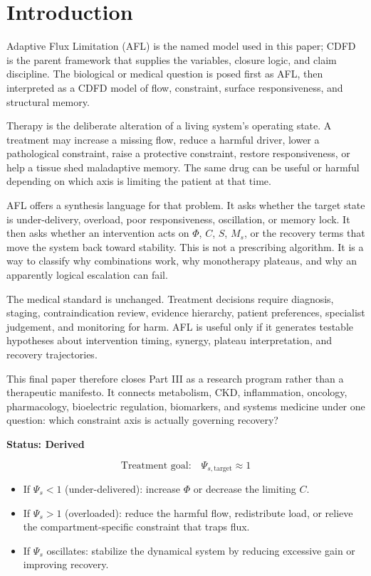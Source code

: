 \documentclass[12pt,a4paper]{article}
\begin{document}
\section{Introduction}

Adaptive Flux Limitation (AFL) is the named model used in this paper; CDFD is the parent framework that supplies the variables, closure logic, and claim discipline. The biological or medical question is posed first as AFL, then interpreted as a CDFD model of flow, constraint, surface responsiveness, and structural memory.

Therapy is the deliberate alteration of a living system's operating state. A treatment may increase a missing flow, reduce a harmful driver, lower a pathological constraint, raise a protective constraint, restore responsiveness, or help a tissue shed maladaptive memory. The same drug can be useful or harmful depending on which axis is limiting the patient at that time.

AFL offers a synthesis language for that problem. It asks whether the target state is under-delivery, overload, poor responsiveness, oscillation, or memory lock. It then asks whether an intervention acts on $\Phi$, $C$, $S$, $M_s$, or the recovery terms that move the system back toward stability. This is not a prescribing algorithm. It is a way to classify why combinations work, why monotherapy plateaus, and why an apparently logical escalation can fail.

The medical standard is unchanged. Treatment decisions require diagnosis, staging, contraindication review, evidence hierarchy, patient preferences, specialist judgement, and monitoring for harm. AFL is useful only if it generates testable hypotheses about intervention timing, synergy, plateau interpretation, and recovery trajectories.

This final paper therefore closes Part III as a research program rather than a therapeutic manifesto. It connects metabolism, CKD, inflammation, oncology, pharmacology, bioelectric regulation, biomarkers, and systems medicine under one question: which constraint axis is actually governing recovery?

\textbf{Status: Derived}

\begin{equation}
    \text{Treatment goal:} \quad \Psi_{s,\mathrm{target}} \approx 1
\end{equation}

\begin{itemize}
    \item If $\Psi_s < 1$ (under-delivered): increase $\Phi$ or decrease the limiting $C$.
    \item If $\Psi_s > 1$ (overloaded): reduce the harmful flow, redistribute load, or relieve the compartment-specific constraint that traps flux.
    \item If $\Psi_s$ oscillates: stabilize the dynamical system by reducing excessive gain or improving recovery.
\end{itemize}
\end{document}
